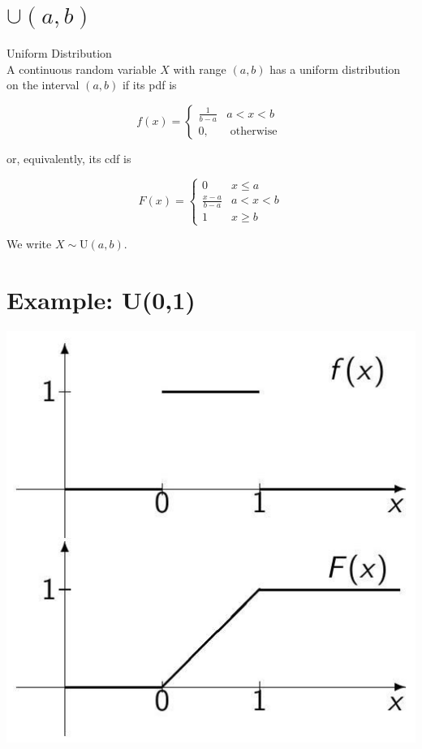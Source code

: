 \documentclass[10pt]{article}
\begin{document}
\section*{$\cup(a, b)$}
Uniform Distribution\\
A continuous random variable $X$ with range $(a, b)$ has a uniform distribution on the interval $(a, b)$ if its pdf is

$$
f(x)= \begin{cases}\frac{1}{b-a} & a<x<b \\ 0, & \text { otherwise }\end{cases}
$$

or, equivalently, its cdf is

$$
F(x)= \begin{cases}0 & x \leq a \\ \frac{x-a}{b-a} & a<x<b \\ 1 & x \geq b\end{cases}
$$

We write $X \sim \mathrm{U}(a, b)$.

\section*{Example: U(0,1)}
\begin{center}
\includegraphics[max width=\textwidth]{2025_05_11_1201cfe24e14b364b4ecg-19}
\end{center}
\end{document}
